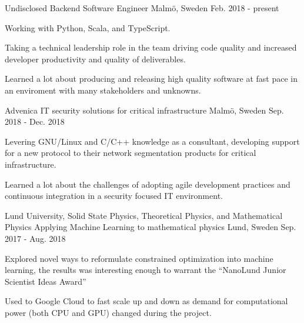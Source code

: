 


\begin{cventries}


\cventry
{Undisclosed} %
{Backend Software Engineer} %
{Malmö, Sweden} %
{Feb. 2018 - present} %
{ %
\begin{cvitems}
\item {Working with Python, Scala, and TypeScript.}
\item {Taking a technical leadership role in the team driving code quality
       and increased developer productivity and quality of deliverables.}
\item {Learned a lot about producing and releasing high quality
       software at fast pace in an enviroment with many stakeholders and
       unknowns.}
\end{cvitems}
}


\cventry
{Advenica} %
{IT security solutions for critical infrastructure} %
{Malmö, Sweden} %
{Sep. 2018 - Dec. 2018} %
{ %
\begin{cvitems}
\item {Levering GNU/Linux and C/C++ knowledge as a consultant, developing support for a new protocol to their network segmentation products for critical infrastructure.}
\item {Learned a lot about the challenges of adopting agile development practices and continuous
integration in a security focused IT environment.}
\end{cvitems}
}

\cventry
{Lund University, Solid State Physics, Theoretical Physics, and Mathematical Physics} %
{Applying Machine Learning to mathematical physics } %
{Lund, Sweden} %
{Sep. 2017 - Aug. 2018} %
{ %
\begin{cvitems}
\item {Explored novel ways to reformulate constrained optimization into
machine learning, the results was interesting enough to warrant the ``NanoLund Junior Scientist Ideas Award''}
\item {Used to Google Cloud to fast scale up and down as demand for
computational power (both CPU and GPU) changed during the project.}
\end{cvitems}
}


\end{cventries}

